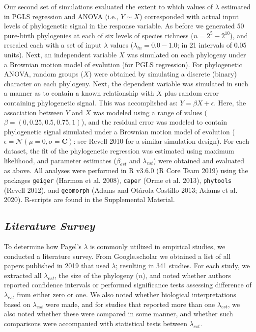 \documentclass[
]{article}
\begin{document}
Our second set of simulations evaluated the extent to which values of
\(\lambda\) estimated in PGLS regression and ANOVA (i.e., \(Y\sim{X}\))
corresponded with actual input levels of phylogenetic signal in the
response variable. As before we generated 50 pure-birth phylogenies at
each of six levels of species richness (\(n=2^5 - 2^{10}\)), and
rescaled each with a set of input \(\lambda\) values
(\(\lambda_{in} = 0.0 - 1.0\); in 21 intervals of 0.05 units). Next, an
independent variable \(X\) was simulated on each phylogeny under a
Brownian motion model of evolution (for PGLS regression). For
phylogenetic ANOVA, random groups (\(X\)) were obtained by simulating a
discrete (binary) character on each phylogeny. Next, the dependent
variable was simulated in such a manner as to contain a known
relationship with \(X\) plus random error containing phylogenetic
signal. This was accomplished as: \(Y=\beta{X}+\epsilon\). Here, the
association between \(Y\) and \(X\) was modeled using a range of values
(\(\beta=(0,0.25, 0.5, 0.75,1)\)), and the residual error was modeled to
contain phylogenetic signal simulated under a Brownian motion model of
evolution (\(\epsilon=\mathcal{N}(\mu=0,\sigma=\mathbf{C})\): see Revell
2010 for a similar simulation design). For each dataset, the fit of the
phylogenetic regression was estimated using maximum likelihood, and
parameter estimates (\(\beta_{est}\) and \(\lambda_{est}\)) were
obtained and evaluated as above. All analyses were performed in R v3.6.0
(R Core Team 2019) using the packages \texttt{geiger} (Harmon et al.
2008), \texttt{caper} (Orme et al. 2013), \texttt{phytools} (Revell
2012), and \texttt{geomorph} (Adams and Otárola-Castillo 2013; Adams et
al. 2020). R-scripts are found in the Supplemental Material.

\hypertarget{literature-survey}{%
\subsection{\texorpdfstring{\emph{Literature
Survey}}{Literature Survey}}\label{literature-survey}}

To determine how Pagel's \(\lambda\) is commonly utilized in empirical
studies, we conducted a literature survey. From Google.scholar we
obtained a list of all papers published in 2019 that used \(\lambda\);
resulting in 341 studies. For each study, we extracted all
\(\lambda_{est}\), the size of the phylogeny (\(n\)), and noted whether
authors reported confidence intervals or performed significance tests
assessing difference of \(\lambda_{est}\) from either zero or one. We
also noted whether biological interpretations based on \(\lambda_{est}\)
were made, and for studies that reported more than one
\(\lambda_{est}\), we also noted whether these were compared in some
manner, and whether such comparisons were accompanied with statistical
tests between \(\lambda_{est}\). \hfill\break
\end{document}
